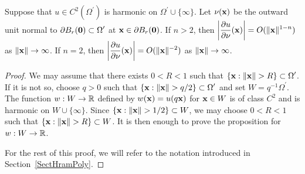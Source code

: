 \begin{prop} \label{pot_infty_ddu}
Suppose that $\displaystyle u\in C^2(\Omega^{\prime})$ is harmonic on
$\displaystyle \Omega^{\prime} \cup \{\infty\}$.  Let
$\mathbf{\nu}(\mathbf{x})$ be the outward
unit normal to $\displaystyle \partial B_r(\mathbf{0}) \subset \Omega^{\prime}$ at
$\mathbf{x} \in \partial B_r(\mathbf{0})$.
If $n>2$, then
$\displaystyle \left| \frac{\partial{u}}{\partial \mathbf{\nu}}(\mathbf{x})\right| =
O(\|\mathbf{x}\|^{1-n})$ as $\|\mathbf{x}\|\rightarrow \infty$.  If $n=2$, then
$\displaystyle \left| \frac{\partial{u}}{\partial \mathbf{\nu}}(\mathbf{x})\right| =
O(\|\mathbf{x}\|^{-2})$ as $\|\mathbf{x}\|\rightarrow \infty$.
\end{prop}

\begin{proof}
We may assume that there exists $0<R<1$ such that
$\displaystyle \left\{ \mathbf{x} : \|\mathbf{x}\| > R \right\} \subset
\Omega^{\prime}$.
If it is not so, choose $q > 0$ such that 
$\displaystyle \left\{ \mathbf{x} : \|\mathbf{x}\| > q/2 \right\} \subset
\Omega^{\prime}$ and set $\displaystyle W = q^{-1} \Omega^{\prime}$.
The function $w: W \to \mathbb{R}$ defined by
$w(\mathbf{x}) = u(q \mathbf{x})$ for $\mathbf{x} \in W$
is of class $\displaystyle C^2$ and is harmonic on $W \cup \{\infty\}$.
Since $\displaystyle \left\{ \mathbf{x} : \|\mathbf{x}\| > 1/2 \right\} \subset W$,
we may choose $0<R<1$ such that
$\displaystyle \left\{ \mathbf{x} : \|\mathbf{x}\| > R \right\} \subset W$.
It is then enough to prove the proposition for $w: W \to \mathbb{R}$.

For the rest of this proof, we will refer to the notation introduced
in Section~\ref{SectHramPoly}.


\end{proof}
